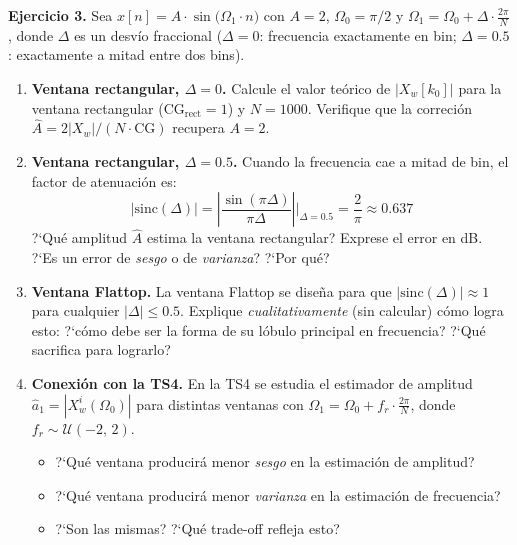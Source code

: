 \documentclass[11pt, a4paper]{article}
\begin{document}
\begin{exbox}
\textbf{Ejercicio 3.}
Sea $x[n] = A\cdot\sin\!\bigl(\Omega_1\cdot n\bigr)$ con $A = 2$,
$\Omega_0 = \pi/2$ y $\Omega_1 = \Omega_0 + \Delta\cdot\tfrac{2\pi}{N}$,
donde $\Delta$ es un desvío fraccional ($\Delta = 0$: frecuencia exactamente en bin;
$\Delta = 0.5$: exactamente a mitad entre dos bins).

\begin{enumerate}[label=\textbf{\alph*)}]

  \item \textbf{Ventana rectangular, $\Delta = 0$.}
  Calcule el valor te\'orico de $|X_w[k_0]|$ para la ventana rectangular
  ($\text{CG}_{\text{rect}} = 1$) y $N = 1000$.
  Verifique que la correci\'on $\hat{A} = 2|X_w|/(N\cdot\text{CG})$ recupera $A = 2$.

  \item \textbf{Ventana rectangular, $\Delta = 0.5$.}
  Cuando la frecuencia cae a mitad de bin, el factor de atenuaci\'on es:
  $$|\text{sinc}(\Delta)| = \left|\frac{\sin(\pi\Delta)}{\pi\Delta}\right|
  \bigg|_{\Delta=0.5} = \frac{2}{\pi} \approx 0.637$$
  ?`Qu\'e amplitud $\hat{A}$ estima la ventana rectangular?
  Exprese el error en dB.
  ?`Es un error de \emph{sesgo} o de \emph{varianza}? ?`Por qu\'e?

  \item \textbf{Ventana Flattop.}
  La ventana Flattop se dise\~na para que $|\text{sinc}(\Delta)| \approx 1$
  para cualquier $|\Delta| \leq 0.5$.
  Explique \emph{cualitativamente} (sin calcular) c\'omo logra esto:
  ?`c\'omo debe ser la forma de su l\'obulo principal en frecuencia?
  ?`Qu\'e sacrifica para lograrlo?

  \item \textbf{Conexi\'on con la TS4.}
  En la TS4 se estudia el estimador de amplitud $\hat{a}_1 = |X_w^i(\Omega_0)|$
  para distintas ventanas con $\Omega_1 = \Omega_0 + f_r\cdot\tfrac{2\pi}{N}$,
  donde $f_r \sim \mathcal{U}(-2,\,2)$.
  \begin{itemize}[noitemsep]
    \item ?`Qu\'e ventana producir\'a menor \emph{sesgo} en la estimaci\'on de amplitud?
    \item ?`Qu\'e ventana producir\'a menor \emph{varianza} en la estimaci\'on de frecuencia?
    \item ?`Son las mismas? ?`Qu\'e trade-off refleja esto?
  \end{itemize}

\end{enumerate}
\end{exbox}
\end{document}
